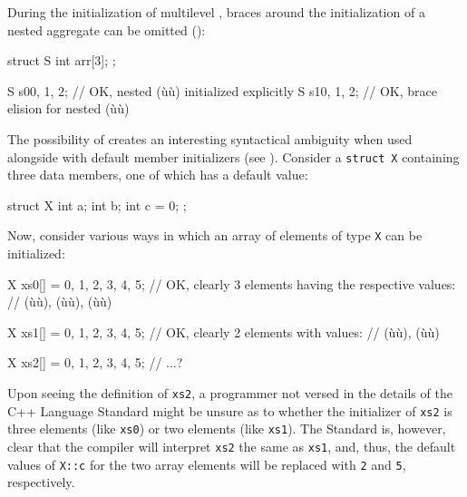 During the initialization of multilevel , braces
around the initialization of a nested aggregate can be omitted
():

\begin{emcppslisting}
struct S
{
    int arr[3];
};

S s0{{0, 1, 2}};  // OK, nested (ù{}ù) initialized explicitly
S s1{0, 1, 2};    // OK, brace elision for nested (ù{}ù)
\end{emcppslisting}

\noindent The possibility of  creates an interesting
syntactical ambiguity when used alongside  with
default member initializers (see ). Consider a
\lstinline!struct!~\lstinline!X! containing three data members, one of which
has a default value:

\begin{emcppslisting}[emcppsbatch=e5]
struct X
{
    int a;
    int b;
    int c = 0;
};
\end{emcppslisting}

\noindent Now, consider various ways in which an array of elements of type
\lstinline!X! can be initialized:

\begin{emcppslisting}[emcppsbatch=e5,emcppsstandards={c++14},emcppserrorlines={9}]
X xs0[] = {{0, 1}, {2, 3}, {4, 5}};
    // OK, clearly 3 elements having the respective values:
    // (ù{}ù), (ù{}ù), (ù{}ù)

X xs1[] = {{0, 1, 2}, {3, 4, 5}};
    // OK, clearly 2 elements with values:
    // (ù{}ù), (ù{}ù)

X xs2[] = {0, 1, 2, 3, 4, 5};
    // ...?
\end{emcppslisting}

\noindent Upon seeing the definition of \lstinline!xs2!, a programmer not versed in
the details of the C++ Language Standard might be unsure as to whether the
initializer of \lstinline!xs2! is three elements (like \lstinline!xs0!) or two
elements (like \lstinline!xs1!). The Standard is, however, clear that the
compiler will interpret \lstinline!xs2! the same as \lstinline!xs1!, and,
thus, the default values of \lstinline!X::c! for the two array elements
will be replaced with \lstinline!2! and \lstinline!5!, respectively.

